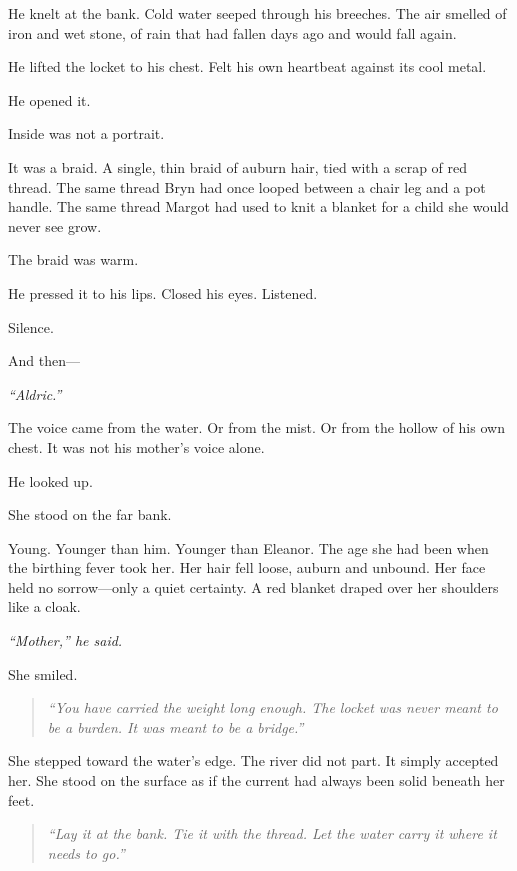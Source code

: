 He knelt at the bank. Cold water seeped through his breeches. The air smelled of iron and wet stone, of rain that had fallen days ago and would fall again.

He lifted the locket to his chest. Felt his own heartbeat against its cool metal.

He opened it.

\vspace{1em}

Inside was not a portrait.

It was a braid. A single, thin braid of auburn hair, tied with a scrap of red thread. The same thread Bryn had once looped between a chair leg and a pot handle. The same thread Margot had used to knit a blanket for a child she would never see grow.

The braid was warm.

He pressed it to his lips. Closed his eyes. Listened.

Silence.

And then—

\begin{center}
\textit{``Aldric.''}
\end{center}

The voice came from the water. Or from the mist. Or from the hollow of his own chest. It was not his mother's voice alone.

He looked up.

She stood on the far bank.

Young. Younger than him. Younger than Eleanor. The age she had been when the birthing fever took her. Her hair fell loose, auburn and unbound. Her face held no sorrow—only a quiet certainty. A red blanket draped over her shoulders like a cloak.

\begin{center}
\textit{``Mother,'' he said.}
\end{center}

She smiled.

\begin{quote}
\textit{``You have carried the weight long enough. The locket was never meant to be a burden. It was meant to be a bridge.''}
\end{quote}

She stepped toward the water's edge. The river did not part. It simply accepted her. She stood on the surface as if the current had always been solid beneath her feet.

\begin{quote}
\textit{``Lay it at the bank. Tie it with the thread. Let the water carry it where it needs to go.''}
\end{quote}


